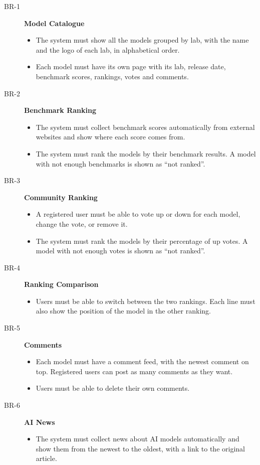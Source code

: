 \documentclass[11pt,a4paper]{article}
\begin{document}
\begin{description}
  \item[BR-1] \textbf{Model Catalogue}
  \begin{itemize}
    \item The system must show all the models grouped by lab, with the name and the logo of each lab, in alphabetical order.
    \item Each model must have its own page with its lab, release date, benchmark scores, rankings, votes and comments.
  \end{itemize}
  \item[BR-2] \textbf{Benchmark Ranking}
  \begin{itemize}
    \item The system must collect benchmark scores automatically from external websites and show where each score comes from.
    \item The system must rank the models by their benchmark results. A model with not enough benchmarks is shown as ``not ranked''.
  \end{itemize}
  \item[BR-3] \textbf{Community Ranking}
  \begin{itemize}
    \item A registered user must be able to vote up or down for each model, change the vote, or remove it.
    \item The system must rank the models by their percentage of up votes. A model with not enough votes is shown as ``not ranked''.
  \end{itemize}
  \item[BR-4] \textbf{Ranking Comparison}
  \begin{itemize}
    \item Users must be able to switch between the two rankings. Each line must also show the position of the model in the other ranking.
  \end{itemize}
  \item[BR-5] \textbf{Comments}
  \begin{itemize}
    \item Each model must have a comment feed, with the newest comment on top. Registered users can post as many comments as they want.
    \item Users must be able to delete their own comments.
  \end{itemize}
  \item[BR-6] \textbf{AI News}
  \begin{itemize}
    \item The system must collect news about AI models automatically and show them from the newest to the oldest, with a link to the original article.

\end{itemize}
\end{description}
\end{document}
